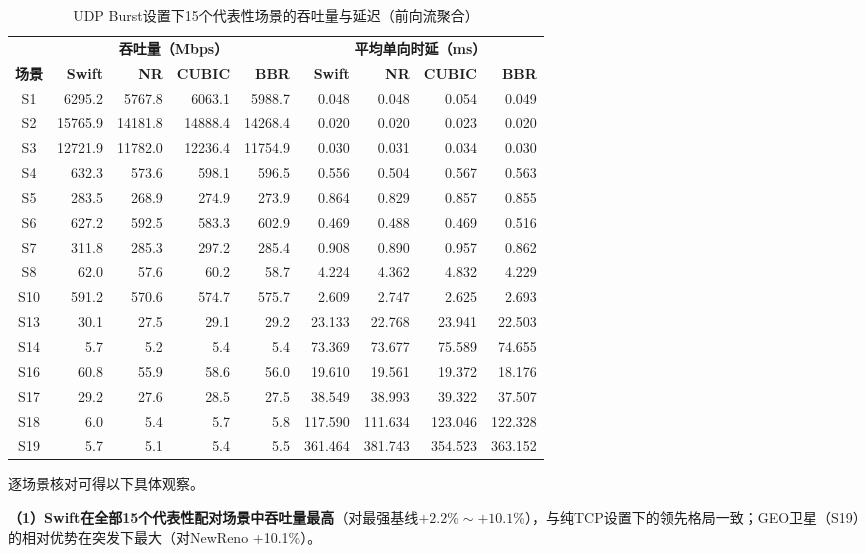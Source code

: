 \begin{table}[htbp]
\centering
\caption{UDP Burst设置下15个代表性场景的吞吐量与延迟（前向流聚合）}
\label{tab:udp-burst-headline}
\footnotesize
\setlength{\tabcolsep}{4pt}
\begin{tabular}{|c|rrrr|rrrr|}
\hline
& \multicolumn{4}{c|}{\textbf{吞吐量（Mbps）}} & \multicolumn{4}{c|}{\textbf{平均单向时延（ms）}} \\
\textbf{场景} & \textbf{Swift} & \textbf{NR} & \textbf{CUBIC} & \textbf{BBR} & \textbf{Swift} & \textbf{NR} & \textbf{CUBIC} & \textbf{BBR} \\
\hline
S1 & 6295.2 & 5767.8 & 6063.1 & 5988.7 & 0.048 & 0.048 & 0.054 & 0.049 \\
S2 & 15765.9 & 14181.8 & 14888.4 & 14268.4 & 0.020 & 0.020 & 0.023 & 0.020 \\
S3 & 12721.9 & 11782.0 & 12236.4 & 11754.9 & 0.030 & 0.031 & 0.034 & 0.030 \\
S4 & 632.3 & 573.6 & 598.1 & 596.5 & 0.556 & 0.504 & 0.567 & 0.563 \\
S5 & 283.5 & 268.9 & 274.9 & 273.9 & 0.864 & 0.829 & 0.857 & 0.855 \\
S6 & 627.2 & 592.5 & 583.3 & 602.9 & 0.469 & 0.488 & 0.469 & 0.516 \\
S7 & 311.8 & 285.3 & 297.2 & 285.4 & 0.908 & 0.890 & 0.957 & 0.862 \\
S8 & 62.0 & 57.6 & 60.2 & 58.7 & 4.224 & 4.362 & 4.832 & 4.229 \\
S10 & 591.2 & 570.6 & 574.7 & 575.7 & 2.609 & 2.747 & 2.625 & 2.693 \\
S13 & 30.1 & 27.5 & 29.1 & 29.2 & 23.133 & 22.768 & 23.941 & 22.503 \\
S14 & 5.7 & 5.2 & 5.4 & 5.4 & 73.369 & 73.677 & 75.589 & 74.655 \\
S16 & 60.8 & 55.9 & 58.6 & 56.0 & 19.610 & 19.561 & 19.372 & 18.176 \\
S17 & 29.2 & 27.6 & 28.5 & 27.5 & 38.549 & 38.993 & 39.322 & 37.507 \\
S18 & 6.0 & 5.4 & 5.7 & 5.8 & 117.590 & 111.634 & 123.046 & 122.328 \\
S19 & 5.7 & 5.1 & 5.4 & 5.5 & 361.464 & 381.743 & 354.523 & 363.152 \\
\hline
\end{tabular}
\end{table}

逐场景核对可得以下具体观察。

\textbf{（1）Swift在全部15个代表性配对场景中吞吐量最高}（对最强基线$+2.2\%\sim+10.1\%$），与纯TCP设置下的领先格局一致；GEO卫星（S19）的相对优势在突发下最大（对NewReno +10.1\%）。

